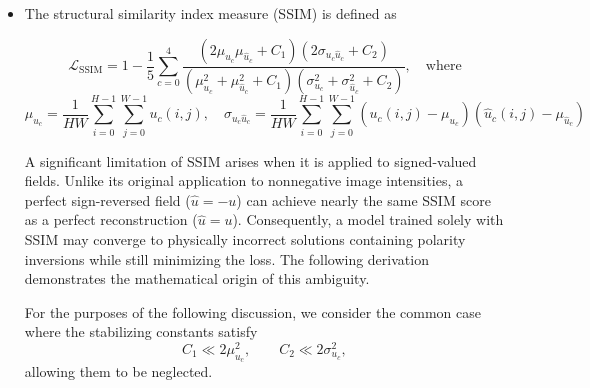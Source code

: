 \documentclass[preprint,review,12pt]{elsarticle}
\begin{document}
\begin{itemize}
Experimentally, this training schedule consistently outperformed training with either MAE or MSE alone for the same total number of epochs. The resulting predictions retained substantially sharper boundaries than models trained exclusively with MSE, while achieving lower validation MAE and MSE than models trained exclusively with MAE. Among the non-Huber training strategies investigated, the hybrid schedule produced the best overall balance between qualitative feature preservation and quantitative accuracy, converging to within approximately 10\% of the validation error achieved by Huber loss. Although less adaptive than Huber, which transitions between MAE- and MSE-like behavior on a per-residual basis, the epoch-wise transition captures much of the same optimization benefit.

\item The structural similarity index measure (SSIM) is defined as

\begin{equation*}
\mathcal{L}_{\text{SSIM}}
=
1
-
\frac{1}{5}
\sum_{c=0}^{4}
\frac{
\left(2\mu_{u_c}\mu_{\hat{u}_c}+C_1\right)
\left(2\sigma_{u_c\hat{u}_c}+C_2\right)
}{
\left(\mu_{u_c}^2+\mu_{\hat{u}_c}^2+C_1\right)
\left(\sigma_{u_c}^2+\sigma_{\hat{u}_c}^2+C_2\right) 
}, \quad \text{where}
\end{equation*}
\begin{equation*}
\mu_{u_c}
=
\frac{1}{HW}
\sum_{i=0}^{H-1}
\sum_{j=0}^{W-1}
u_c(i,j), \quad 
\sigma_{u_c\hat{u}_c}
=
\frac{1}{HW}
\sum_{i=0}^{H-1}
\sum_{j=0}^{W-1}
\left(u_c(i,j)-\mu_{u_c}\right)
\left(\hat{u}_c(i,j)-\mu_{\hat{u}_c}\right)
\end{equation*}

A significant limitation of SSIM arises when it is applied to signed-valued fields. Unlike its original application to nonnegative image intensities, a perfect sign-reversed field ($\hat{u}=-u$) can achieve nearly the same SSIM score as a perfect reconstruction ($\hat{u}=u$). Consequently, a model trained solely with SSIM may converge to physically incorrect solutions containing polarity inversions while still minimizing the loss. The following derivation demonstrates the mathematical origin of this ambiguity.

For the purposes of the following discussion, we consider the common case where the stabilizing constants satisfy
\begin{equation*}
    C_1 \ll 2\mu_{u_c}^2,
    \qquad
    C_2 \ll 2\sigma_{u_c}^2,
\end{equation*}
allowing them to be neglected.


\end{itemize}
\end{document}
